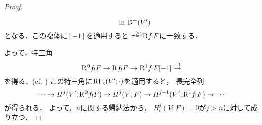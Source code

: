 \begin{proof}
\begin{center}
\begin{minipage}{.9\textwidth}
\begin{redleftbar}
\[                \quad\text{in \(\mathsf{D}^+(V')\)}
            \]
            となる．この複体に\([-1]\)を適用すると
            \(\tau^{\geqq1}\mathrm{R} f_!F\)に一致する．
        \end{redleftbar}
        \end{minipage}
    \end{center}
    よって，特三角
    \[
        \mathrm{R}^0 f_!F
        \to\mathrm{R} f_!F
        \to\mathrm{R}^1 f_!F[-1]
        \overset{+1}{\to}
    \]
    を得る．(cf. \cite[(1.7.2)]{KS90})
    この特三角に\(\mathop{\mathrm{R}\hspace{-0pt}\Gamma}\nolimits_c(V';\cdot)\)を適用すると，
    長完全列
    \[
        \cdots\to H^j(V';\mathrm{R}^0 f_!F)
        \to H^j(V;F)
        \to H^{j-1}(V';\mathrm{R}^1 f_!F)
        \to\cdots
    \]
    が得られる．
    よって，\(n\)に関する帰納法から，
    \(H_c^j(V;F)=0\)が\(j>n\)に対して成り立つ．
\end{proof}





